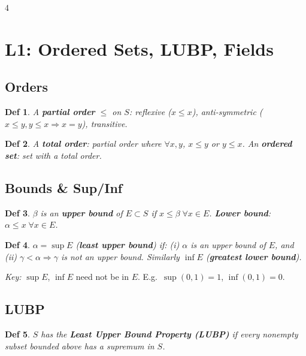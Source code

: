 \documentclass[9pt,landscape]{extarticle}
\theoremstyle{compact}
\newtheorem*{defn}{Def}
\begin{document}
\begin{multicols}{4}
\raggedcolumns

\section{L1: Ordered Sets, LUBP, Fields}

\subsection{Orders}
\begin{defn}
A \textbf{partial order} $\leq$ on $S$: reflexive ($x \leq x$), anti-symmetric ($x \leq y, y \leq x \Rightarrow x = y$), transitive.
\end{defn}

\begin{defn}
A \textbf{total order}: partial order where $\forall x,y$, $x \leq y$ or $y \leq x$. An \textbf{ordered set}: set with a total order.
\end{defn}

\subsection{Bounds \& Sup/Inf}
\begin{defn}
$\beta$ is an \textbf{upper bound} of $E \subset S$ if $x \leq \beta\;\forall x \in E$. \textbf{Lower bound}: $\alpha \leq x\;\forall x \in E$.
\end{defn}

\begin{defn}
$\alpha = \sup E$ (\textbf{least upper bound}) if: (i) $\alpha$ is an upper bound of $E$, and (ii) $\gamma < \alpha \Rightarrow \gamma$ is not an upper bound. Similarly $\inf E$ (\textbf{greatest lower bound}).
\end{defn}

\textit{Key:} $\sup E$, $\inf E$ need not be in $E$. E.g.\ $\sup(0,1)=1$, $\inf(0,1)=0$.

\subsection{LUBP}
\begin{defn}
$S$ has the \textbf{Least Upper Bound Property (LUBP)} if every nonempty subset bounded above has a supremum in $S$.
\end{defn}


\end{multicols}
\end{document}
